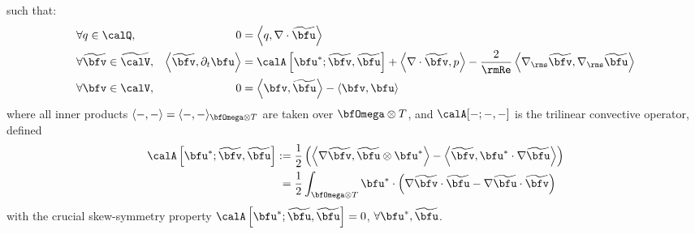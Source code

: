     such that:
    \begin{align}
        &\forall                 q  \in  \calQ,              &                                                            0  &=  \left\langle q, \nabla\cdot\widetilde{\bfu}\right\rangle  \\
        &\forall  \widetilde{\bfv}  \in  \widetilde{\calV},  &  \left\langle\widetilde{\bfv}, \partial_{t}\bfu\right\rangle  &=  \calA\left[\bfu^{*}; \widetilde{\bfv}, \widetilde{\bfu}\right] + \left\langle\nabla\cdot\widetilde{\bfv}, p\right\rangle - \frac{2}{\rmRe}\left\langle\nabla_{\rms}\widetilde{\bfv}, \nabla_{\rms}\widetilde{\bfu}\right\rangle  \\
        &\forall              \bfv  \in  \calV,              &                                                            0  &=  \left\langle\bfv, \widetilde{\bfu}\right\rangle - \left\langle\bfv, \bfu\right\rangle
    \end{align}
    where all inner products $\langle -, -\rangle  =  \langle -, -\rangle_{\bfOmega\otimes T}$ are taken over $\bfOmega\otimes T$, and $\calA[-; -, -]$ is the trilinear convective operator, defined
    \begin{align}
        \calA\left[\bfu^{*}; \widetilde{\bfv}, \widetilde{\bfu}\right]  :=  &\;\frac{1}{2}\left(\left\langle\nabla\widetilde{\bfv}, \widetilde{\bfu}\otimes\bfu^{*}\right\rangle - \left\langle\widetilde{\bfv}, \bfu^{*}\cdot\nabla\widetilde{\bfu}\right\rangle\right)  \label{eqn:convective operator definition}  \\
        =  &\;\frac{1}{2}\int_{\bfOmega\otimes T}\bfu^{*}\cdot\left(\nabla\widetilde{\bfv}\cdot\widetilde{\bfu} - \nabla\widetilde{\bfu}\cdot\widetilde{\bfv}\right)
    \end{align}
    with the crucial skew-symmetry property $\calA\left[\bfu^{*}; \widetilde{\bfu}, \widetilde{\bfu}\right] 
     =  0$, $\forall \bfu^{*}, \widetilde{\bfu}$.

    \begin{remark}
    \end{remark}

